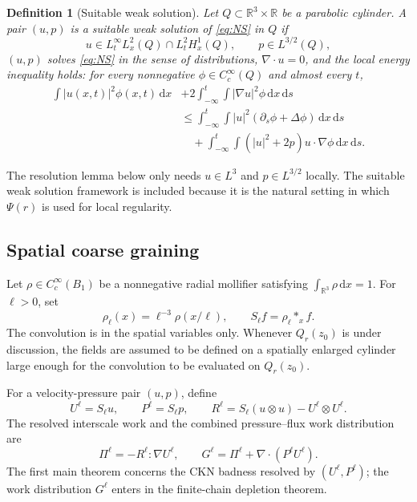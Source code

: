 \documentclass[10pt,a4paper]{amsart}
\numberwithin{equation}{section}
\newtheorem{definition}[theorem]{Definition}
\newcommand{\R}{\mathbb R}
\newcommand{\dx}{\,\mathrm dx}
\newcommand{\dxds}{\,\mathrm dx\,\mathrm ds}
\begin{document}
\begin{definition}[Suitable weak solution]
Let $Q\subset\R^3\times\R$ be a parabolic cylinder.  A pair $(u,p)$ is a suitable weak solution of \eqref{eq:NS} in $Q$ if
\[
u\in L_t^\infty L_x^2(Q)\cap L_t^2H_x^1(Q),
\qquad
p\in L^{3/2}(Q),
\]
$(u,p)$ solves \eqref{eq:NS} in the sense of distributions, $\nabla\cdot u=0$, and the local energy inequality holds: for every nonnegative $\phi\in C_c^\infty(Q)$ and almost every $t$,
\begin{align}
\int |u(x,t)|^2\phi(x,t)\dx
&+2\int_{-\infty}^{t}\int |\nabla u|^2\phi\dxds
\nonumber\\
&\le
\int_{-\infty}^{t}\int |u|^2(\partial_s\phi+\Delta\phi)\dxds
\nonumber\\
&\quad+
\int_{-\infty}^{t}\int (|u|^2+2p)u\cdot\nabla\phi\dxds.
\end{align}
\end{definition}

The resolution lemma below only needs $u\in L^3$ and $p\in L^{3/2}$ locally.  The suitable weak solution framework is included because it is the natural setting in which $\Psi(r)$ is used for local regularity.

\subsection{Spatial coarse graining}

Let $\rho\in C_c^\infty(B_1)$ be a nonnegative radial mollifier satisfying $\int_{\R^3}\rho\dx=1$.  For $\ell>0$, set
\[
\rho_\ell(x)=\ell^{-3}\rho(x/\ell),
\qquad
S_\ell f=\rho_\ell *_x f.
\]
The convolution is in the spatial variables only.  Whenever $Q_r(z_0)$ is under discussion, the fields are assumed to be defined on a spatially enlarged cylinder large enough for the convolution to be evaluated on $Q_r(z_0)$.

For a velocity-pressure pair $(u,p)$, define
\begin{equation}\label{eq:coarse-fields}
U^\ell=S_\ell u,
\qquad
P^\ell=S_\ell p,
\qquad
R^\ell=S_\ell(u\otimes u)-U^\ell\otimes U^\ell.
\end{equation}
The resolved interscale work and the combined pressure--flux work distribution are
\begin{equation}\label{eq:work-defs}
\Pi^\ell=-R^\ell:\nabla U^\ell,
\qquad
G^\ell=\Pi^\ell+\nabla\cdot(P^\ell U^\ell).
\end{equation}
The first main theorem concerns the CKN badness resolved by $(U^\ell,P^\ell)$; the work distribution $G^\ell$ enters in the finite-chain depletion theorem.
\end{document}
